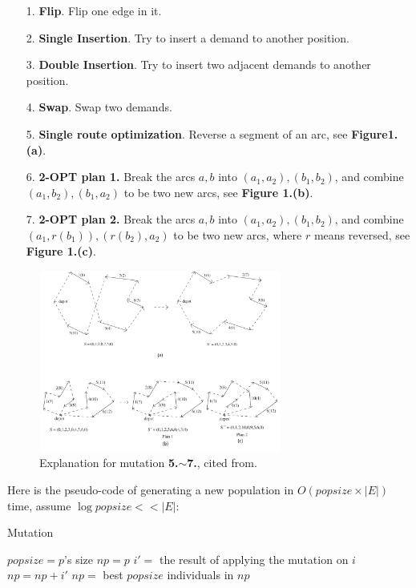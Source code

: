 \documentclass[lettersize,journal]{IEEEtran}
\begin{document}
\begin{itemize}
    \item [1.] \textbf{Flip}. Flip one edge in it.
    \item [2.] \textbf{Single Insertion}. Try to insert a demand to another position.
    \item [3.] \textbf{Double Insertion}. Try to insert two adjacent demands to another position.
    \item [4.] \textbf{Swap}. Swap two demands\cite{ref3}.
    \item [5.] \textbf{Single route optimization}. Reverse a segment of an arc, see \textbf{Figure1.(a)}.
    \item [6.] \textbf{2-OPT plan 1.} Break the arcs $a,b$ into $(a_1,a_2),(b_1,b_2)$, and combine $(a_1,b_2),(b_1,a_2)$ to be two new arcs, see \textbf{Figure 1.(b)}.
    \item [7.] \textbf{2-OPT plan 2.} Break the arcs $a,b$ into $(a_1,a_2),(b_1,b_2)$, and combine $(a_1,r(b_1)),(r(b_2),a_2)$ to be two new arcs, where $r$ means reversed, see \textbf{Figure 1.(c)}\cite{ref2}.
\end{itemize}

\begin{figure}
    \centering
    \includegraphics[height=6cm,width=8cm]{fig1.png}
    \caption{Explanation for mutation \textbf{5.$\sim$7.}, cited from\cite{ref2}.}
    \label{fig1}
\end{figure}

Here is the pseudo-code of generating a new population in $O(popsize\times|E|)$ time, assume $\log popsize<<|E|$:

\begin{algorithm}
    \caption{Mutation}
    $popsize=p$'s size\;
    $np=p$\;
     {
         {
            $i'=$ the result of applying the mutation on $i$\;
             {
                $np=np+i'$\;
            }
        }
    }
    $np=$ best $popsize$ individuals in $np$\;
\end{algorithm}
\end{document}
